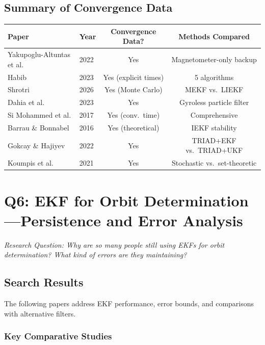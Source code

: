 \documentclass[11pt]{article}
\begin{document}
\subsection{Summary of Convergence Data}

\begin{center}
\begin{tabular}{@{}llcc@{}}
\toprule
Paper & Year & Convergence Data? & Methods Compared \\
\midrule
Yakupoglu-Altuntas et al. & 2022 & Yes & Magnetometer-only backup \\
Habib & 2023 & Yes (explicit times) & 5 algorithms \\
Shrotri & 2026 & Yes (Monte Carlo) & MEKF vs.\ LIEKF \\
Dahia et al. & 2023 & Yes & Gyroless particle filter \\
Si Mohammed et al. & 2017 & Yes (conv.\ time) & Comprehensive \\
Barrau \& Bonnabel & 2016 & Yes (theoretical) & IEKF stability \\
Gokcay \& Hajiyev & 2022 & Yes & TRIAD+EKF vs.\ TRIAD+UKF \\
Koumpis et al. & 2021 & Yes & Stochastic vs.\ set-theoretic \\
\bottomrule
\end{tabular}
\end{center}

\section{Q6: EKF for Orbit Determination---Persistence and Error Analysis}
\label{sec:ekf}

\textit{Research Question: Why are so many people still using EKFs for orbit determination? What kind of errors are they maintaining?}

\subsection{Search Results}
The following papers address EKF performance, error bounds, and comparisons with alternative filters.

\subsubsection{Key Comparative Studies}
\end{document}
